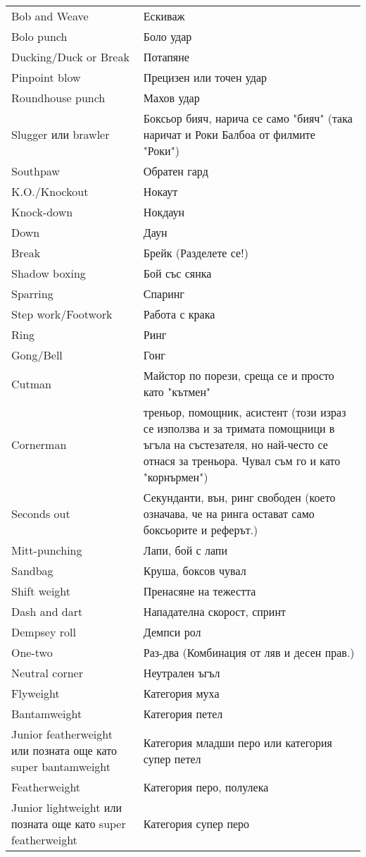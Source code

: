 \begin{longtable}{|p{}|p{}|}
Bob and Weave&Ескиваж\\ 
Bolo punch&Боло удар\\ 
Ducking/Duck or Break&Потапяне\\ 
Pinpoint blow&Прецизен или точен удар\\ 
Roundhouse punch&Махов удар\\ 
Slugger или brawler&Боксьор бияч, нарича се само "бияч" (така наричат и Роки Балбоа от филмите "Роки")\\ 
Southpaw&Обратен гард\\ 
K.O./Knockout&Нокаут\\ 
Knock-down&Нокдаун\\ 
Down&Даун\\ 
Break&Брейк (Разделете се!)\\ 
Shadow boxing&Бой със сянка\\ 
Sparring&Спаринг\\ 
Step work/Footwork&Работа с крака\\ 
Ring&Ринг\\ 
Gong/Bell&Гонг\\ 
Cutman&Майстор по порези, среща се и просто като "кътмен"\\ 
Cornerman&треньор, помощник, асистент (този израз се използва и за тримата помощници в ъгъла на състезателя, но най-често се отнася за треньора. Чувал съм го и като "корнърмен")\\ 
Seconds out&Секунданти, вън, ринг свободен (което означава, че на ринга остават само боксьорите и реферът.)\\ 
Mitt-punching&Лапи, бой с лапи\\ 
Sandbag&Круша, боксов чувал\\ 
Shift weight&Пренасяне на тежестта\\ 
Dash and dart&Нападателна скорост, спринт\\ 
Dempsey roll&Демпси рол\\ 
One-two&Раз-два (Комбинация от ляв и десен прав.)\\ 
Neutral corner&Неутрален ъгъл\\ 
Flyweight&Категория муха\\ 
Bantamweight&Категория петел\\ 
Junior featherweight или позната още като super bantamweight&Категория младши перо или категория супер петел\\ 
Featherweight&Категория перо, полулека\\ 
Junior lightweight или позната още като super featherweight&Категория супер перо\\ 

\end{longtable}
